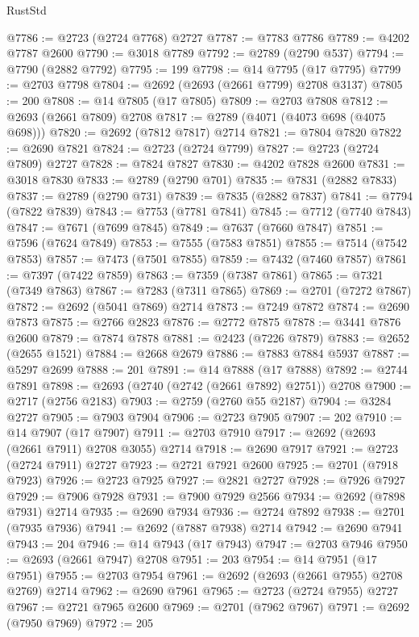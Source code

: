 \begin{lexlean}{RustStd}
\begin{coremodule}
@7786 := @2723 (@2724 @7768) @2727
@7787 := @7783 @7786
@7789 := @4202 @7787 @2600
@7790 := @3018 @7789
@7792 := @2789 (@2790 @537)
@7794 := @7790 (@2882 @7792)
@7795 := 199
@7798 := @14 @7795 (@17 @7795)
@7799 := @2703 @7798
@7804 := @2692 (@2693 (@2661 @7799) @2708 @3137)
@7805 := 200
@7808 := @14 @7805 (@17 @7805)
@7809 := @2703 @7808
@7812 := @2693 (@2661 @7809) @2708
@7817 := @2789 (@4071 (@4073 @698 (@4075 @698)))
@7820 := @2692 (@7812 @7817) @2714
@7821 := @7804 @7820
@7822 := @2690 @7821
@7824 := @2723 (@2724 @7799)
@7827 := @2723 (@2724 @7809) @2727
@7828 := @7824 @7827
@7830 := @4202 @7828 @2600
@7831 := @3018 @7830
@7833 := @2789 (@2790 @701)
@7835 := @7831 (@2882 @7833)
@7837 := @2789 (@2790 @731)
@7839 := @7835 (@2882 @7837)
@7841 := @7794 (@7822 @7839)
@7843 := @7753 (@7781 @7841)
@7845 := @7712 (@7740 @7843)
@7847 := @7671 (@7699 @7845)
@7849 := @7637 (@7660 @7847)
@7851 := @7596 (@7624 @7849)
@7853 := @7555 (@7583 @7851)
@7855 := @7514 (@7542 @7853)
@7857 := @7473 (@7501 @7855)
@7859 := @7432 (@7460 @7857)
@7861 := @7397 (@7422 @7859)
@7863 := @7359 (@7387 @7861)
@7865 := @7321 (@7349 @7863)
@7867 := @7283 (@7311 @7865)
@7869 := @2701 (@7272 @7867)
@7872 := @2692 (@5041 @7869) @2714
@7873 := @7249 @7872
@7874 := @2690 @7873
@7875 := @2766 @2823
@7876 := @2772 @7875
@7878 := @3441 @7876 @2600
@7879 := @7874 @7878
@7881 := @2423 (@7226 @7879)
@7883 := @2652 (@2655 @1521)
@7884 := @2668 @2679
@7886 := @7883 @7884 @5937
@7887 := @5297 @2699
@7888 := 201
@7891 := @14 @7888 (@17 @7888)
@7892 := @2744 @7891
@7898 := @2693 (@2740 (@2742 (@2661 @7892) @2751)) @2708
@7900 := @2717 (@2756 @2183)
@7903 := @2759 (@2760 @55 @2187)
@7904 := @3284 @2727
@7905 := @7903 @7904
@7906 := @2723 @7905
@7907 := 202
@7910 := @14 @7907 (@17 @7907)
@7911 := @2703 @7910
@7917 := @2692 (@2693 (@2661 @7911) @2708 @3055) @2714
@7918 := @2690 @7917
@7921 := @2723 (@2724 @7911) @2727
@7923 := @2721 @7921 @2600
@7925 := @2701 (@7918 @7923)
@7926 := @2723 @7925
@7927 := @2821 @2727
@7928 := @7926 @7927
@7929 := @7906 @7928
@7931 := @7900 @7929 @2566
@7934 := @2692 (@7898 @7931) @2714
@7935 := @2690 @7934
@7936 := @2724 @7892
@7938 := @2701 (@7935 @7936)
@7941 := @2692 (@7887 @7938) @2714
@7942 := @2690 @7941
@7943 := 204
@7946 := @14 @7943 (@17 @7943)
@7947 := @2703 @7946
@7950 := @2693 (@2661 @7947) @2708
@7951 := 203
@7954 := @14 @7951 (@17 @7951)
@7955 := @2703 @7954
@7961 := @2692 (@2693 (@2661 @7955) @2708 @2769) @2714
@7962 := @2690 @7961
@7965 := @2723 (@2724 @7955) @2727
@7967 := @2721 @7965 @2600
@7969 := @2701 (@7962 @7967)
@7971 := @2692 (@7950 @7969)
@7972 := 205

\end{coremodule}
\end{lexlean}
